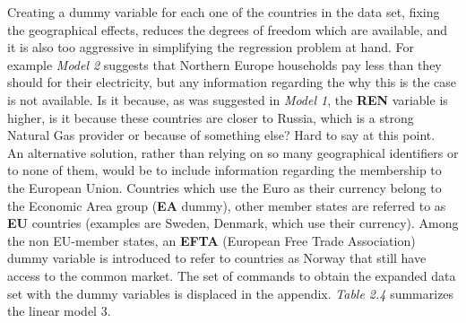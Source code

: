 \documentclass{book}
\begin{document}
Creating a dummy variable for each one of the countries in the data set, fixing the geographical effects, reduces the degrees of freedom which are available, and it is also too aggressive in simplifying the regression problem at hand. For example \textit{Model 2} suggests that Northern Europe households pay less than they should for their electricity, but any information regarding the why this is the case is not available. Is it because, as was suggested in \textit{Model 1}, the \textbf{REN} variable is higher, is it because these countries are closer to Russia, which is a strong Natural Gas provider or because of something else? Hard to say at this point.\\

An alternative solution, rather than relying on so many geographical identifiers or to none of them, would be to include information regarding the membership to the European Union. Countries which use the Euro as their currency belong to the Economic Area group (\textbf{EA} dummy), other member states are referred to as \textbf{EU} countries (examples are Sweden, Denmark, which use their currency). Among the non EU-member states, an \textbf{EFTA} (European Free Trade Association) dummy variable is introduced to refer to countries as Norway that still have access to the common market. The set of commands to obtain the expanded data set with the dummy variables is displaced in the appendix. \textit{Table 2.4} summarizes the linear model 3.
\end{document}
